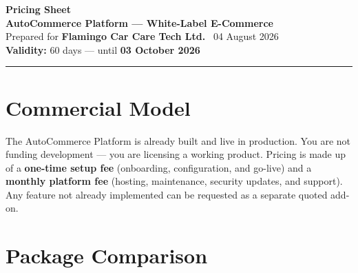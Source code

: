 \documentclass[11pt,a4paper]{article}
\begin{document}
\begin{center}
  {\Huge\bfseries\color{accent}Pricing Sheet}\\[0.4em]
  {\large\bfseries AutoCommerce Platform --- White-Label E-Commerce}\\[0.2em]
  {\normalsize\color{gray}Prepared for \textbf{Flamingo Car Care Tech
  Ltd.} \textbar\ 04 August 2026}\\[0.2em]
  {\normalsize\color{gray}\textbf{Validity:} 60 days ---
  until \textbf{03 October 2026}}\\[1.2em]
  \rule{\textwidth}{1.2pt}
\end{center}

\section*{Commercial Model}

The AutoCommerce Platform is already built and live in production.
You are not funding development --- you are licensing a working
product. Pricing is made up of a \textbf{one-time setup fee}
(onboarding, configuration, and go-live) and a
\textbf{monthly platform fee} (hosting, maintenance, security
updates, and support). Any feature not already implemented
can be requested as a separate quoted add-on.

\section*{Package Comparison}
\end{document}
